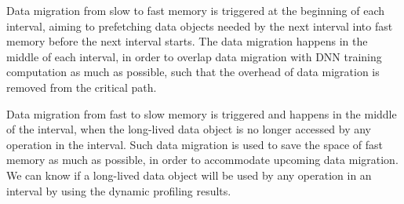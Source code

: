 Data migration from slow to fast memory is triggered at the beginning of each interval, aiming to prefetching data objects needed by the next interval into fast memory before the next interval starts. The data migration happens in the middle of each interval, in order to overlap data migration with DNN training computation as much as possible, such that the overhead of data migration is removed from the critical path. 

Data migration from fast to slow memory is triggered and happens in the middle of the interval, when the long-lived data object is \textcolor{dong}{no longer accessed by any operation in the interval}. Such data migration is used to save the space of fast memory as much as possible, in order to accommodate upcoming data migration. \textcolor{dong}{We can know if a long-lived data object will be used by any operation in an interval by using the dynamic profiling results.}

